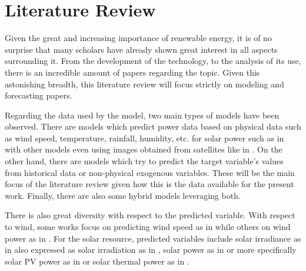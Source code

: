 \section{Literature Review}

Given the great and increasing importance of renewable energy, it is of no surprise that many scholars have already shown great interest in all aspects surrounding it. From the development of the technology, to the analysis of its use, there is an incredible amount of papers regarding the topic. Given this astonishing breadth, this literature review will focus strictly on modeling and forecasting papers.

Regarding the data used by the model, two main types of models have been observed. There are models which predict power data based on physical data such as wind speed, temperature, rainfall, humidity, etc. for solar power such as in \cite{wang_urquhart_kleissl_2019} with other models even using images obtained from satellites like in \cite{shen_yao_wen_he_jiang_2018}. On the other hand, there are models which try to predict the target variable's values from historical data or non-physical exogenous variables. These will be the main focus of the literature review given how this is the data available for the present work. Finally, there are also some hybrid models leveraging both.  

There is also great diversity with respect to the predicted variable. With respect to wind, some works focus on predicting wind speed as in \cite{he_nie_guo_wang_2020} while others on wind power as in \cite{wang_tao_hu_zeng_2020}. For the solar resource, predicted variables include solar irradiance as in \cite{alzahrani_shamsi_cihan_ferdowsi_2017} also expressed as solar irradiation as in \cite{learning_2017}, solar power as in \cite{suresh_janik_guerrero_leonowicz_sikorski_2020} or more specifically solar PV power as in \cite{sharadga_hajimirza_balog_2020} or solar thermal power as in \cite{wang_guo_zhang_song_duan_duan_2020}.

